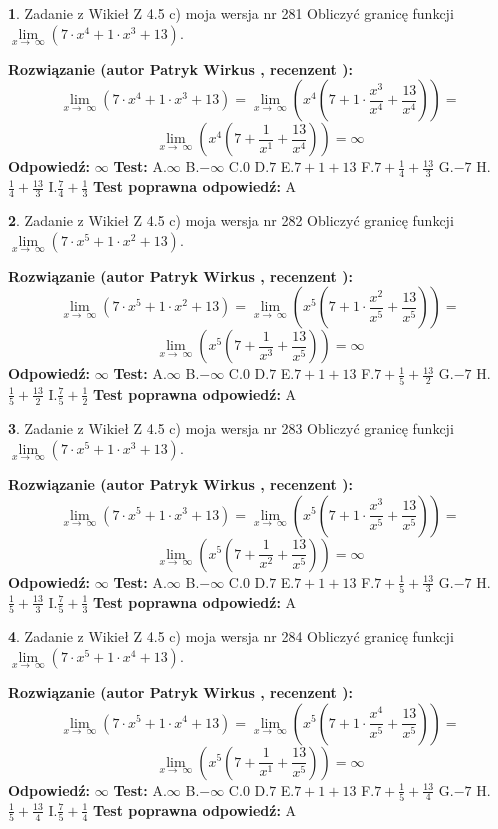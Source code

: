 \documentclass[12pt, a4paper]{article}
\theoremstyle{definition} %
\newtheorem{zad}{}
\newcommand{\zadStart}[1]{\begin{zad}#1\newline}
\newcommand{\zadStop}{\end{zad}}
\newcommand{\rozwStart}[2]{\noindent \textbf{Rozwiązanie (autor #1 , recenzent #2): }\newline}
\newcommand{\rozwStop}{\newline}
\newcommand{\odpStart}{\noindent \textbf{Odpowiedź:}\newline}
\newcommand{\odpStop}{\newline}
\newcommand{\testStart}{\noindent \textbf{Test:}\newline}
\newcommand{\testStop}{\newline}
\newcommand{\kluczStart}{\noindent \textbf{Test poprawna odpowiedź:}\newline}
\newcommand{\kluczStop}{\newline}
\begin{document}
\zadStart{Zadanie z Wikieł Z 4.5 c) moja wersja nr 281}
Obliczyć granicę funkcji  $\lim\limits_{x\to\ \infty}(7 \cdot x^{4}+1 \cdot x^{3}+13)$.
\zadStop
\rozwStart{Patryk Wirkus}{}
$$\lim\limits_{x\to\ \infty}(7 \cdot x^{4}+1 \cdot x^{3}+13) = \lim\limits_{x\to\ \infty}(x^{4}(7 +1 \cdot \frac{x^{3}}{x^{4}}+\frac{13}{x^{4}})) =$$ $$\lim\limits_{x\to\ \infty}(x^{4}(7 +\frac{1}{x^{1}}+\frac{13}{x^{4}})) =\infty$$
\rozwStop
\odpStart
$\infty$
\odpStop
\testStart
A.$\infty$ B.$-\infty$ C.$0$ D.$7$ E.$7 + 1 + 13$
F.$7+\frac{1}{4}+\frac{13}{3}$ G.$-7$
H.$\frac{1}{4}+\frac{13}{3}$
I.$\frac{7}{4}+\frac{1}{3}$
\testStop
\kluczStart
A
\kluczStop



\zadStart{Zadanie z Wikieł Z 4.5 c) moja wersja nr 282}
Obliczyć granicę funkcji  $\lim\limits_{x\to\ \infty}(7 \cdot x^{5}+1 \cdot x^{2}+13)$.
\zadStop
\rozwStart{Patryk Wirkus}{}
$$\lim\limits_{x\to\ \infty}(7 \cdot x^{5}+1 \cdot x^{2}+13) = \lim\limits_{x\to\ \infty}(x^{5}(7 +1 \cdot \frac{x^{2}}{x^{5}}+\frac{13}{x^{5}})) =$$ $$\lim\limits_{x\to\ \infty}(x^{5}(7 +\frac{1}{x^{3}}+\frac{13}{x^{5}})) =\infty$$
\rozwStop
\odpStart
$\infty$
\odpStop
\testStart
A.$\infty$ B.$-\infty$ C.$0$ D.$7$ E.$7 + 1 + 13$
F.$7+\frac{1}{5}+\frac{13}{2}$ G.$-7$
H.$\frac{1}{5}+\frac{13}{2}$
I.$\frac{7}{5}+\frac{1}{2}$
\testStop
\kluczStart
A
\kluczStop



\zadStart{Zadanie z Wikieł Z 4.5 c) moja wersja nr 283}
Obliczyć granicę funkcji  $\lim\limits_{x\to\ \infty}(7 \cdot x^{5}+1 \cdot x^{3}+13)$.
\zadStop
\rozwStart{Patryk Wirkus}{}
$$\lim\limits_{x\to\ \infty}(7 \cdot x^{5}+1 \cdot x^{3}+13) = \lim\limits_{x\to\ \infty}(x^{5}(7 +1 \cdot \frac{x^{3}}{x^{5}}+\frac{13}{x^{5}})) =$$ $$\lim\limits_{x\to\ \infty}(x^{5}(7 +\frac{1}{x^{2}}+\frac{13}{x^{5}})) =\infty$$
\rozwStop
\odpStart
$\infty$
\odpStop
\testStart
A.$\infty$ B.$-\infty$ C.$0$ D.$7$ E.$7 + 1 + 13$
F.$7+\frac{1}{5}+\frac{13}{3}$ G.$-7$
H.$\frac{1}{5}+\frac{13}{3}$
I.$\frac{7}{5}+\frac{1}{3}$
\testStop
\kluczStart
A
\kluczStop



\zadStart{Zadanie z Wikieł Z 4.5 c) moja wersja nr 284}
Obliczyć granicę funkcji  $\lim\limits_{x\to\ \infty}(7 \cdot x^{5}+1 \cdot x^{4}+13)$.
\zadStop
\rozwStart{Patryk Wirkus}{}
$$\lim\limits_{x\to\ \infty}(7 \cdot x^{5}+1 \cdot x^{4}+13) = \lim\limits_{x\to\ \infty}(x^{5}(7 +1 \cdot \frac{x^{4}}{x^{5}}+\frac{13}{x^{5}})) =$$ $$\lim\limits_{x\to\ \infty}(x^{5}(7 +\frac{1}{x^{1}}+\frac{13}{x^{5}})) =\infty$$
\rozwStop
\odpStart
$\infty$
\odpStop
\testStart
A.$\infty$ B.$-\infty$ C.$0$ D.$7$ E.$7 + 1 + 13$
F.$7+\frac{1}{5}+\frac{13}{4}$ G.$-7$
H.$\frac{1}{5}+\frac{13}{4}$
I.$\frac{7}{5}+\frac{1}{4}$
\testStop
\kluczStart
A
\kluczStop
\end{document}
